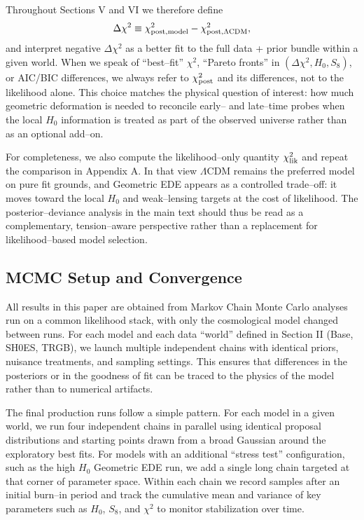 \documentclass[a4paper,11pt]{article}
\begin{document}
Throughout Sections V and VI we therefore define
\begin{equation}
\Delta\chi^2 \equiv \chi^2_{\rm post, model} - \chi^2_{\rm post,\Lambda{\rm CDM}},
\end{equation}
and interpret negative $\Delta\chi^2$ as a better fit to the full data + prior bundle within a given world. When we speak of ``best--fit'' $\chi^2$, ``Pareto fronts'' in $(\Delta\chi^2, H_0, S_8)$, or AIC/BIC differences, we always refer to $\chi^2_{\rm post}$ and its differences, not to the likelihood alone. This choice matches the physical question of interest: how much geometric deformation is needed to reconcile early-- and late--time probes when the local $H_0$ information is treated as part of the observed universe rather than as an optional add--on.

For completeness, we also compute the likelihood--only quantity $\chi^2_{\rm lik}$ and repeat the comparison in Appendix A. In that view $\Lambda$CDM remains the preferred model on pure fit grounds, and Geometric EDE appears as a controlled trade--off: it moves toward the local $H_0$ and weak--lensing targets at the cost of likelihood. The posterior--deviance analysis in the main text should thus be read as a complementary, tension--aware perspective rather than a replacement for likelihood--based model selection.


\subsection{MCMC Setup and Convergence}
\label{sec:mcmc}

All results in this paper are obtained from Markov Chain Monte Carlo analyses run on a common likelihood stack, with only the cosmological model changed between runs. For each model and each data ``world'' defined in Section II (Base, SH0ES, TRGB), we launch multiple independent chains with identical priors, nuisance treatments, and sampling settings. This ensures that differences in the posteriors or in the goodness of fit can be traced to the physics of the model rather than to numerical artifacts.

The final production runs follow a simple pattern. For each model in a given world, we run four independent chains in parallel using identical proposal distributions and starting points drawn from a broad Gaussian around the exploratory best fits. For models with an additional ``stress test'' configuration, such as the high $H_0$ Geometric EDE run, we add a single long chain targeted at that corner of parameter space. Within each chain we record samples after an initial burn--in period and track the cumulative mean and variance of key parameters such as $H_0$, $S_8$, and $\chi^2$ to monitor stabilization over time.
\end{document}
